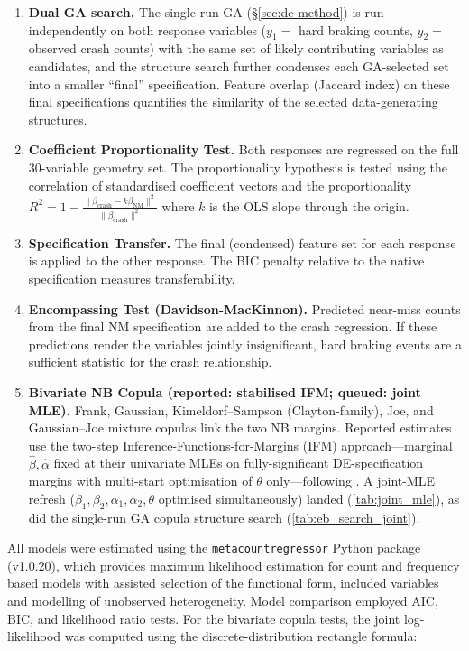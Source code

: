 \documentclass[letterpaper,8pt]{extarticle}  %
\begin{document}
\begin{doublespacing}
\begin{linenumbers}
\begin{enumerate}
    \item \textbf{Dual GA search.} The single-run GA (\S\ref{sec:de-method}) is run independently on both response variables ($y_1 =$ hard braking counts, $y_2 =$ observed crash counts) with the same set of likely contributing variables as candidates, and the structure search further condenses each GA-selected set into a smaller ``final'' specification. Feature overlap (Jaccard index) on these final specifications quantifies the similarity of the selected data-generating structures.
    \item \textbf{Coefficient Proportionality Test.} Both responses are regressed on the full 30-variable geometry set. The proportionality hypothesis is tested using the correlation of standardised coefficient vectors and the proportionality $R^2 = 1 - \frac{\|\beta_{\text{crash}} - k\beta_{\text{NM}}\|^2}{\|\beta_{\text{crash}}\|^2}$ where $k$ is the OLS slope through the origin.
    \item \textbf{Specification Transfer.} The final (condensed) feature set for each response is applied to the other response. The BIC penalty relative to the native specification measures transferability.
    \item \textbf{Encompassing Test (Davidson-MacKinnon).} Predicted near-miss counts from the final NM specification are added to the crash regression. If these predictions render the variables jointly insignificant, hard braking events are a sufficient statistic for the crash relationship.
    \item \textbf{Bivariate NB Copula (reported: stabilised IFM; queued: joint MLE).} Frank, Gaussian, Kimeldorf--Sampson (Clayton-family), Joe, and Gaussian--Joe mixture copulas link the two NB margins. Reported estimates use the two-step Inference-Functions-for-Margins (IFM) approach---marginal $\hat\beta,\hat\alpha$ fixed at their univariate MLEs on fully-significant DE-specification margins with multi-start optimisation of $\theta$ only---following \citep{Ahmad2023Copula-basedVehicles, Bhowmik2021ExploringModeling,Yasmin2018AModel,Song2026JointApproach}. A joint-MLE refresh ($\beta_1,\beta_2,\alpha_1,\alpha_2,\theta$ optimised simultaneously) landed (\cref{tab:joint_mle}), as did the single-run GA copula structure search (\cref{tab:eb_search_joint}).
\end{enumerate}

All models were estimated using the \texttt{metacount\allowbreak regressor} Python package (v1.0.20), which provides maximum likelihood estimation for count and frequency based models with assisted selection of the functional form, included variables and modelling of unobserved heterogeneity.  Model comparison employed AIC, BIC, and likelihood ratio tests. For the bivariate copula tests, the joint log-likelihood was computed using the discrete-distribution rectangle formula:


\end{linenumbers}
\end{doublespacing}
\end{document}

